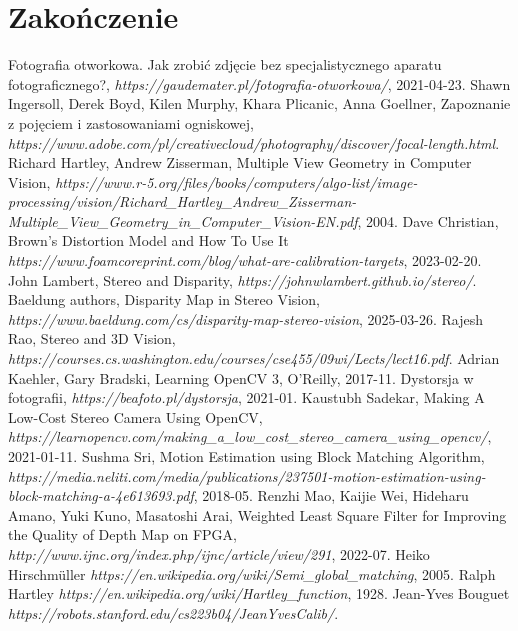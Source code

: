 \documentclass[magisterska]{pracadypl}
\begin{document}
\chapter{Zakończenie}

\renewcommand{\listfigurename}{Spis rysunków}
\listoffigures

\begin{thebibliography}{7}
\raggedright

 Fotografia otworkowa. Jak zrobić zdjęcie bez specjalistycznego aparatu fotograficznego?, \textit{https://gaudemater.pl/fotografia-otworkowa/}, 2021-04-23.
 Shawn Ingersoll, Derek Boyd, Kilen Murphy, Khara Plicanic, Anna Goellner, Zapoznanie z pojęciem i zastosowaniami ogniskowej, \textit{https://www.adobe.com/pl/creativecloud/photography/discover/focal-length.html}.
 Richard Hartley, Andrew Zisserman, Multiple View Geometry in Computer Vision, \textit{https://www.r-5.org/files/books/computers/algo-list/image-processing/vision/Richard\_Hartley\_Andrew\_Zisserman-Multiple\_View\_Geometry\_in\_Computer\_Vision-EN.pdf}, 2004.
 Dave Christian, Brown's Distortion Model and How To Use It \textit{https://www.foamcoreprint.com/blog/what-are-calibration-targets}, 2023-02-20.
 John Lambert, Stereo and Disparity, \textit{https://johnwlambert.github.io/stereo/}.
 Baeldung authors, Disparity Map in Stereo Vision, \textit{https://www.baeldung.com/cs/disparity-map-stereo-vision}, 2025-03-26.
 Rajesh Rao, Stereo and 3D Vision, \textit{https://courses.cs.washington.edu/courses/cse455/09wi/Lects/lect16.pdf}.
 Adrian Kaehler, Gary Bradski, Learning OpenCV 3, O'Reilly, 2017-11.
 Dystorsja w fotografii, \textit{https://beafoto.pl/dystorsja}, 2021-01.
 Kaustubh Sadekar, Making A Low-Cost Stereo Camera Using OpenCV, \textit{https://learnopencv.com/making\_a\_low\_cost\_stereo\_camera\_using\_opencv/}, 2021-01-11.
 Sushma Sri, Motion Estimation using Block Matching
Algorithm, \textit{https://media.neliti.com/media/publications/237501-motion-estimation-using-block-matching-a-4e613693.pdf}, 2018-05.
 Renzhi Mao, Kaijie Wei, Hideharu Amano, Yuki Kuno, Masatoshi Arai, Weighted Least Square Filter for Improving the Quality of Depth Map on FPGA, \textit{http://www.ijnc.org/index.php/ijnc/article/view/291}, 2022-07.
 Heiko Hirschmüller \textit{https://en.wikipedia.org/wiki/Semi\_global\_matching}, 2005.
 Ralph Hartley \textit{https://en.wikipedia.org/wiki/Hartley\_function}, 1928.
 Jean-Yves Bouguet \textit{https://robots.stanford.edu/cs223b04/JeanYvesCalib/}.

\end{thebibliography}
\end{document}
